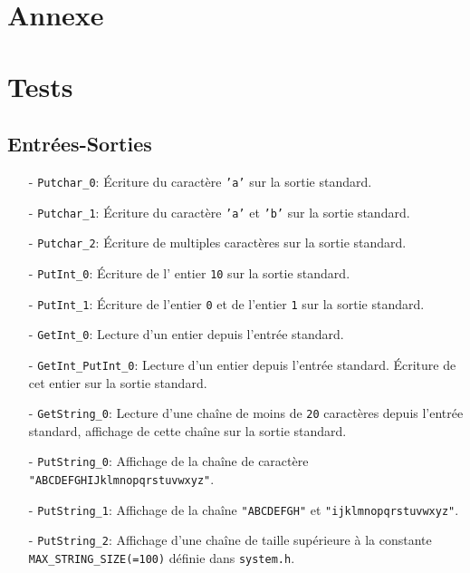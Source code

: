 \documentclass[11pt]{article}
\theoremstyle{definition}
\theoremstyle{definition}
\begin{document}
\section{Annexe}

\section{Tests}

\subsection{Entrées-Sorties}
\begin{itemize}
\item[-] \texttt{Putchar\_0}: Écriture du caractère \texttt{'a'} sur la sortie standard.
\item[-] \texttt{Putchar\_1}: Écriture du caractère \texttt{'a'} et \texttt{'b'} sur la sortie standard.
\item[-] \texttt{Putchar\_2}: Écriture de multiples caractères sur la sortie standard.
\item[-] \texttt{PutInt\_0}: Écriture de l' entier \texttt{10} sur la sortie standard.
\item[-] \texttt{PutInt\_1}: Écriture de l'entier \texttt{0} et de l'entier \texttt{1} sur la sortie standard.
\item[-] \texttt{GetInt\_0}: Lecture d'un entier depuis l'entrée standard.
\item[-] \texttt{GetInt\_PutInt\_0}:
  Lecture d'un entier depuis l'entrée standard.
  Écriture de cet entier sur la sortie standard.
\item[-] \texttt{GetString\_0}: Lecture d'une chaîne de moins de \texttt{20} caractères depuis l'entrée standard, affichage de cette chaîne sur la sortie standard.
\item[-] \texttt{PutString\_0}: Affichage de la chaîne de caractère \texttt{"ABCDEFGHIJklmnopqrstuvwxyz"}.
\item[-] \texttt{PutString\_1}: Affichage de la chaîne \texttt{"ABCDEFGH"} et \texttt{"ijklmnopqrstuvwxyz"}.
\item[-] \texttt{PutString\_2}:   Affichage d'une chaîne de taille supérieure à la
  constante \texttt{MAX\_STRING\_SIZE(=100)} définie dans \texttt{system.h}.
\end{itemize}
\end{document}
